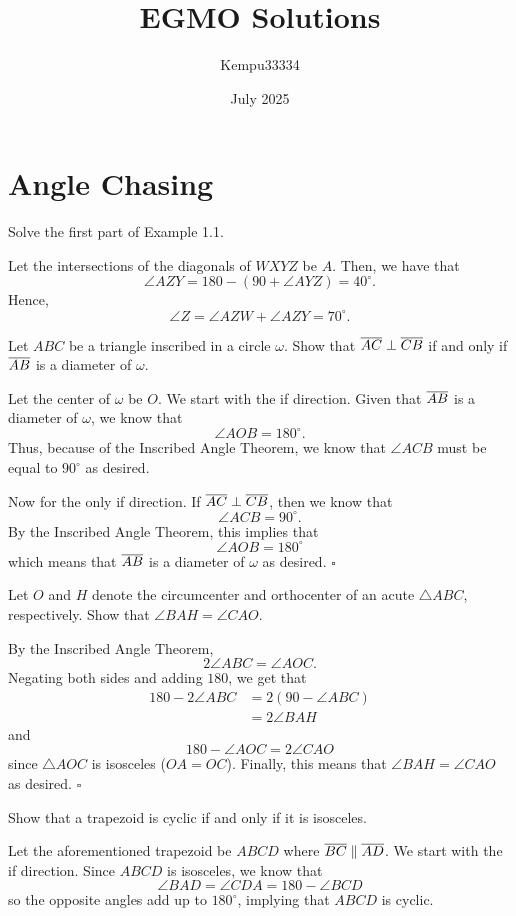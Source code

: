 \documentclass{article}
\title{EGMO Solutions}
\author{Kempu33334}
\date{July 2025}
\begin{document}
\maketitle

\tableofcontents

\newpage

\section{Angle Chasing}

\begin{problem}[1.5]{}
Solve the first part of Example 1.1.
\end{problem}
Let the intersections of the diagonals of $WXYZ$ be $A$. Then, we have that \[\angle AZY = 180-(90+\angle AYZ) = 40^\circ.\] Hence, \[\angle Z =\angle AZW + \angle AZY = \boxed{70^\circ}.\]

\begin{problem}[1.6]{}
Let $ABC$ be a triangle inscribed in a circle $\omega$. Show that $\overline{AC}\perp \overline{CB}$ if and only if $\overline{AB}$ is a diameter of $\omega$.
\end{problem}
Let the center of $\omega$ be $O$. We start with the if direction. Given that $\overline{AB}$ is a diameter of $\omega$, we know that \[\angle AOB = 180^\circ.\] Thus, because of the Inscribed Angle Theorem, we know that $\angle ACB$ must be equal to $90^\circ$ as desired. 

Now for the only if direction. If $\overline{AC} \perp \overline{CB}$, then we know that \[\angle ACB = 90^\circ.\] By the Inscribed Angle Theorem, this implies that \[\angle AOB = 180^\circ\] which means that $\overline{AB}$ is a diameter of $\omega$ as desired. $\square$

\begin{problem}[1.7]{}
Let $O$ and $H$ denote the circumcenter and orthocenter of an acute $\triangle ABC$, respectively. Show that $\angle BAH = \angle CAO$.
\end{problem}
By the Inscribed Angle Theorem, \[2\angle ABC = \angle AOC.\] Negating both sides and adding $180$, we get that
\begin{align*}
180-2\angle ABC &= 2(90-\angle ABC) \\
&= 2\angle BAH
\end{align*}
and \[180-\angle AOC = 2\angle CAO\] since $\triangle AOC$ is isosceles ($OA = OC$). Finally, this means that $\angle BAH = \angle CAO$ as desired. $\square$

\begin{problem}[1.10]{}
Show that a trapezoid is cyclic if and only if it is isosceles.
\end{problem}
Let the aforementioned trapezoid be $ABCD$ where $\overline{BC} \parallel \overline{AD}$. We start with the if direction. Since $ABCD$ is isosceles, we know that \[\angle BAD = \angle CDA = 180-\angle BCD\] so the opposite angles add up to $180^\circ$, implying that $ABCD$ is cyclic. 
\end{document}
